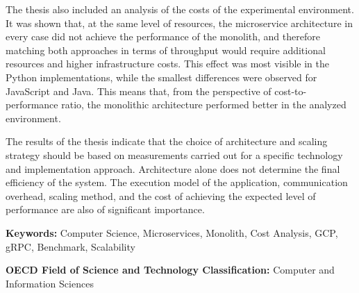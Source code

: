 The thesis also included an analysis of the costs of the experimental environment. It was shown that, at the same level of resources, the microservice architecture in every case did not achieve the performance of the monolith, and therefore matching both approaches in terms of throughput would require additional resources and higher infrastructure costs. This effect was most visible in the Python implementations, while the smallest differences were observed for JavaScript and Java. This means that, from the perspective of cost-to-performance ratio, the monolithic architecture performed better in the analyzed environment.

The results of the thesis indicate that the choice of architecture and scaling strategy should be based on measurements carried out for a specific technology and implementation approach. Architecture alone does not determine the final efficiency of the system. The execution model of the application, communication overhead, scaling method, and the cost of achieving the expected level of performance are also of significant importance.

\vspace{0.5cm}

\noindent \textbf{Keywords:} Computer Science, Microservices, Monolith, Cost Analysis, GCP, gRPC, Benchmark, Scalability

\vspace{0.5cm}

\noindent \textbf{OECD Field of Science and Technology Classification:} Computer and Information Sciences